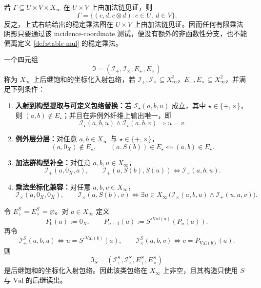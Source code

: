 \begin{proposition}\label{prop:distill-ea-finite-mul-shadow-incidence-uniqueness}
若 \(\Gamma\subseteq U\times V\times X_\infty\) 在 \(U\times V\) 上由加法链见证，则
\[
\Gamma=\{(c,d,c\otimes d):c\in U,\ d\in V\}.
\]
反之，上式右端给出的稳定乘法图在 \(U\times V\) 上由加法链见证。因而任何有限乘法阴影只要通过该 incidence-coordinate 测试，便没有额外的非函数性分支，也不能偏离定义 \ref{def:stable-mul} 的稳定乘法。
\end{proposition}
\begin{definition}[后继饱和的坐标化入射包络]\label{distill:hrushovski_zilber_zariski_geometries_and_elekes_szabo_group_extraction-arithmetic_from_coordinatized_geometry-successor-saturated-incidence-envelope}
一个四元组
\[
\mathfrak I=(\mathcal I_+,\mathcal I_\times,E_+,E_\times)
\]
称为 $X_\infty$ 上后继饱和的坐标化入射包络，若 $\mathcal I_+,\mathcal I_\times\subseteq X_\infty^3$，$E_+,E_\times\subseteq X_\infty^2$，并满足下列条件：
\begin{enumerate}
  \item \textbf{入射到构型提取与可定义包络替换：}若 $\mathcal I_\star(a,b,u)$ 成立，其中 $\star\in\{+,\times\}$，则 $(a,b)\notin E_\star$；并且在非例外纤维上输出唯一，即
  \[
  \mathcal I_\star(a,b,u)\wedge \mathcal I_\star(a,b,v)\Longrightarrow u=v.
  \]
  \item \textbf{例外层分层：}对任意 $a,b\in X_\infty$ 与 $\star\in\{+,\times\}$，
  \[
  (a,0_X)\notin E_\star,
  \qquad
  (a,S(b))\in E_\star\Longleftrightarrow (a,b)\in E_\star.
  \]
  \item \textbf{加法群构型补全：}对任意 $a,b,u\in X_\infty$，
  \[
  \mathcal I_+(a,0_X,a),
  \qquad
  \mathcal I_+(a,S(b),S(u))\Longleftrightarrow \mathcal I_+(a,b,u).
  \]
  \item \textbf{乘法坐标化兼容：}对任意 $a,b,v\in X_\infty$，
  \[
  \mathcal I_\times(a,0_X,0_X),
  \qquad
  \mathcal I_\times(a,S(b),v)\Longleftrightarrow
  \exists u\in X_\infty\,\bigl(\mathcal I_\times(a,b,u)\wedge \mathcal I_+(u,a,v)\bigr).
  \]
\end{enumerate}
\end{definition}

\begin{proposition}[折叠后继给出坐标化入射包络]\label{distill:hrushovski_zilber_zariski_geometries_and_elekes_szabo_group_extraction-arithmetic_from_coordinatized_geometry-envelope-existence-from-successor-fold}
令 $E_+^S=E_\times^S=\varnothing$。对 $a\in X_\infty$ 定义
\[
P_0(a):=0_X,
\qquad
P_{n+1}(a):=S^{\circ\mathrm{Val}(a)}(P_n(a)).
\]
再令
\[
\mathcal I_+^S(a,b,u)\Longleftrightarrow u=S^{\circ\mathrm{Val}(b)}(a),
\qquad
\mathcal I_\times^S(a,b,v)\Longleftrightarrow v=P_{\mathrm{Val}(b)}(a).
\]
则
\[
\mathfrak I_S=(\mathcal I_+^S,\mathcal I_\times^S,E_+^S,E_\times^S)
\]
是后继饱和的坐标化入射包络。因此该类包络在 $X_\infty$ 上非空，且其构造只使用 $S$ 与 $\mathrm{Val}$ 的后继读出。
\end{proposition}

